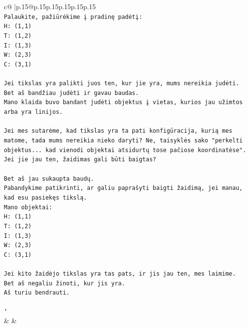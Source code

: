 \documentclass{article}
\begin{document}
{\begin{supertabular}{c@{$\;$}|p{.15\linewidth}@{}p{.15\linewidth}p{.15\linewidth}p{.15\linewidth}p{.15\linewidth}p{.15\linewidth}}
{{{\\ 
\texttt{Palaukite, pažiūrėkime į pradinę padėtį:} \\
\texttt{H: (1,1)} \\
\texttt{T: (1,2)} \\
\texttt{I: (1,3)} \\
\texttt{W: (2,3)} \\
\texttt{C: (3,1)} \\
\\ 
\texttt{Jei tikslas yra palikti juos ten, kur jie yra, mums nereikia judėti. Bet aš bandžiau judėti ir gavau baudas.} \\
\texttt{Mano klaida buvo bandant judėti objektus į vietas, kurios jau užimtos arba yra linijos.} \\
\\ 
\texttt{Jei mes sutarėme, kad tikslas yra ta pati konfigūracija, kurią mes matome, tada mums nereikia nieko daryti? Ne, taisyklės sako "perkelti objektus... kad vienodi objektai atsidurtų tose pačiose koordinatėse". Jei jie jau ten, žaidimas gali būti baigtas?} \\
\\ 
\texttt{Bet aš jau sukaupta baudų.} \\
\texttt{Pabandykime patikrinti, ar galiu paprašyti baigti žaidimą, jei manau, kad esu pasiekęs tikslą.} \\
\texttt{Mano objektai:} \\
\texttt{H: (1,1)} \\
\texttt{T: (1,2)} \\
\texttt{I: (1,3)} \\
\texttt{W: (2,3)} \\
\texttt{C: (3,1)} \\
\\ 
\texttt{Jei kito žaidėjo tikslas yra tas pats, ir jis jau ten, mes laimime.} \\
\texttt{Bet aš negaliu žinoti, kur jis yra.} \\
\texttt{Aš turiu bendrauti.} \\
\\ 
\texttt{'} \\
            }
        }
    }
    & & \\ \\


\end{supertabular}}
\end{document}
